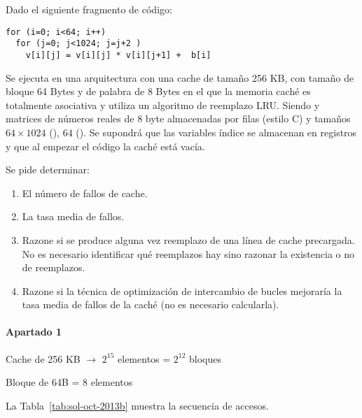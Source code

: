 \begin{acexercise}\end{acexercise}

Dado el siguiente fragmento de código:

\begin{lstlisting}
for (i=0; i<64; i++)
  for (j=0; j<1024; j=j+2 )
    v[i][j] = v[i][j] * v[i][j+1] +  b[i]
\end{lstlisting}

Se ejecuta en una arquitectura con una cache de tamaño 256 KB, con tamaño de
bloque 64 Bytes y de palabra de 8 Bytes en el que la memoria caché es
totalmente asociativa y utiliza un algoritmo de reemplazo LRU. Siendo 
y  matrices de números reales de 8 byte almacenadas por filas (estilo
C) y tamaños $64 \times 1024$ (), $64$ (). Se supondrá que
las variables índice se almacenan en registros y que al empezar el código la
caché está vacía.

Se pide determinar:

\begin{enumerate}
  \item El número de fallos de cache. 

  \item La tasa media de fallos.

  \item Razone si se produce alguna vez reemplazo de una línea de cache
precargada. No es necesario identificar qué reemplazos hay sino razonar la
existencia o no de reemplazos. 

  \item Razone si la técnica de optimización de intercambio de bucles
mejoraría la tasa media de fallos de la caché (no es necesario calcularla).

\end{enumerate}


\begin{acsolution}\end{acsolution}

\paragraph{Apartado 1}

Cache de 256 KB $\rightarrow$ $2^{15}$ elementos = $2^{12}$  bloques

Bloque de 64B = 8 elementos

La Tabla~\ref{tab:sol-oct-2013b} muestra la secuencia de accesos.

